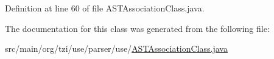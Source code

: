 Definition at line 60 of file A\-S\-T\-Association\-Class.\-java.



The documentation for this class was generated from the following file\-:\begin{DoxyCompactItemize}
\item 
src/main/org/tzi/use/parser/use/\hyperlink{_a_s_t_association_class_8java}{A\-S\-T\-Association\-Class.\-java}\end{DoxyCompactItemize}
